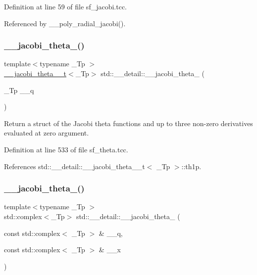 Definition at line 59 of file sf\+\_\+jacobi.\+tcc.



Referenced by \+\_\+\+\_\+poly\+\_\+radial\+\_\+jacobi().

\mbox{\label{namespacestd_1_1____detail_a0e364088497dc54db0bd813d00929f1d}} 
\subsubsection{\texorpdfstring{\+\_\+\+\_\+jacobi\+\_\+theta\+\_()}{\_\_jacobi\_theta\_0()}}
{\footnotesize\ttfamily template$<$typename \+\_\+\+Tp $>$ \\
\hyperlink{structstd_1_1____detail_1_1____jacobi__theta__0__t}{\+\_\+\+\_\+jacobi\+\_\+theta\+\_\+\_\+t}$<$\+\_\+\+Tp$>$ std\+::\+\_\+\+\_\+detail\+::\+\_\+\+\_\+jacobi\+\_\+theta\+\_ (\begin{DoxyParamCaption}\item[{\+\_\+\+Tp}]{\+\_\+\+\_\+q }\end{DoxyParamCaption})}

Return a struct of the Jacobi theta functions and up to three non-\/zero derivatives evaluated at zero argument. 

Definition at line 533 of file sf\+\_\+theta.\+tcc.



References std\+::\+\_\+\+\_\+detail\+::\+\_\+\+\_\+jacobi\+\_\+theta\+\_\+\_\+t$<$ \+\_\+\+Tp $>$\+::th1p.

\mbox{\label{namespacestd_1_1____detail_a5174b10a8e5a884ce9d6eaf10c15450c}} 
\subsubsection{\texorpdfstring{\+\_\+\+\_\+jacobi\+\_\+theta\+\_()}{\_\_jacobi\_theta\_1()}\hspace{0.1cm}{\footnotesize\ttfamily [1/2]}}
{\footnotesize\ttfamily template$<$typename \+\_\+\+Tp $>$ \\
std\+::complex$<$\+\_\+\+Tp$>$ std\+::\+\_\+\+\_\+detail\+::\+\_\+\+\_\+jacobi\+\_\+theta\+\_ (\begin{DoxyParamCaption}\item[{const std\+::complex$<$ \+\_\+\+Tp $>$ \&}]{\+\_\+\+\_\+q,  }\item[{const std\+::complex$<$ \+\_\+\+Tp $>$ \&}]{\+\_\+\+\_\+x }\end{DoxyParamCaption})}


